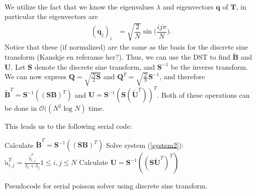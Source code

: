 \\
We utilize the fact that we know the eigenvalues $\lambda$ and eigenvectors $\mathbf{q}$ of $\mathbf{T}$, in particular the eigenvectors are 
\begin{align*}
	(\mathbf{q}_j)_i &= \sqrt{\dfrac{2}{N}}\sin \Big( \dfrac{ij\pi}{N}\Big).
\end{align*}
Notice that these (if normalized) are the same as the basis for the discrete sine transform (Kanskje en referanse her?). Thus, we can use the DST to find $\mathbf{\widetilde{B}}$ and $\mathbf{U}$. Let $\mathbf{S}$ denote the discrete sine transform, and $\mathbf{S}^{-1}$ be the inverse transform. We can now express $\mathbf{Q} = \sqrt{\frac{N}{2}\mathbf{S}}$ and $\mathbf{Q}^T = \sqrt{\frac{2}{N}}\mathbf{S}^{-1}$, and therefore $\mathbf{\widetilde{B}}^T = \mathbf{S}^{-1}((\mathbf{SB})^T)$ and $\mathbf{U} = \mathbf{S}^{-1}(\mathbf{S}(\mathbf{\widetilde{U}}^T))^T$. Both of these operations can be done in $\mathcal{O}((N^2\log{N})$ time. 

This leads us to the following serial code:\\

\begin{algorithm}[H]
 Calculate $\mathbf{\widetilde{B}}^T = \mathbf{S}^{-1}((\mathbf{SB})^T)$  \;
 Solve system (\ref{system2}): $\tilde{u}^T_{i,j} = \frac{\tilde{b}^T_{i,j}}{\lambda_i + \lambda_j} 1 \leq i, j \leq N$\;
 Calculate $\mathbf{U} = \mathbf{S}^{-1}((\mathbf{S}\mathbf{\tilde{U}}^T)^T)$ \;
 \caption{Pseudocode for serial poisson solver using discrete sine transform.}
 \label{code:serial}
\end{algorithm}